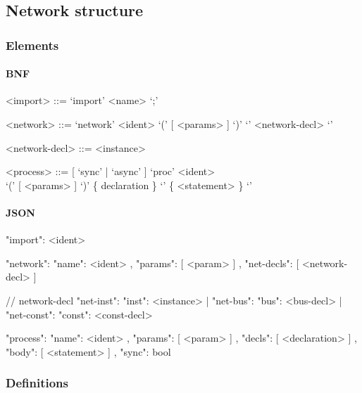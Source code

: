 \documentclass{article}
\begin{document}
\subsection{Network structure}

\subsubsection{Elements}
\paragraph{BNF}
\begin{grammar}
  <import> ::= `import' <name> `;'

  <network> ::= `network' <ident> `(' [ <params> ] `)' `{' <network-decl> `}'

  <network-decl> ::= <instance>

  <process> ::= [ `sync' | `async' ] `proc' <ident> \\ `(' [
  <params> ] `)' \{ declaration \} `{' \{ <statement> \} `}'
\end{grammar}

\paragraph{JSON}
\begin{jsoncode}
 {"import": <ident>}

 {"network": { "name": <ident>
             , "params": [ <param> ]
             , "net-decls": [ <network-decl> ]
             }
 }

// network-decl
{ "net-inst": { "inst": <instance> }
| "net-bus": { "bus": <bus-decl> }
| "net-const": { "const": <const-decl> }
}

 {"process": { "name": <ident>
             , "params": [ <param> ]
             , "decls": [ <declaration> ]
             , "body": [ <statement> ]
             , "sync": bool
             }
}
\end{jsoncode}

\subsubsection{Definitions}
\end{document}
